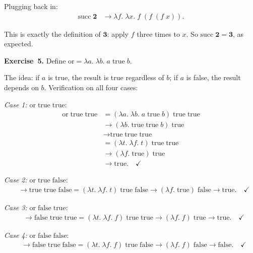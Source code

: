 \documentclass[11pt]{article}
\begin{document}
Plugging back in:
\begin{align*}
  \text{succ}\;\mathbf{2}
    &\longrightarrow \lambda f.\;\lambda x.\; f\;(f\;(f\; x)).
\end{align*}

This is exactly the definition of $\mathbf{3}$: apply $f$ three times
to $x$.  So $\text{succ}\;\mathbf{2} = \mathbf{3}$, as expected.

\medskip
\textbf{Exercise~5.}
Define $\text{or} = \lambda a.\;\lambda b.\; a\;\text{true}\; b$.

The idea: if $a$ is true, the result is true regardless of $b$; if
$a$ is false, the result depends on $b$.  Verification on all four
cases:

\medskip
\emph{Case 1:} $\text{or}\;\text{true}\;\text{true}$:
\begin{align*}
  \text{or}\;\text{true}\;\text{true}
    &= (\lambda a.\;\lambda b.\; a\;\text{true}\; b)\;\text{true}\;\text{true} \\
    &\longrightarrow (\lambda b.\; \text{true}\;\text{true}\; b)\;\text{true} \\
    &\longrightarrow \text{true}\;\text{true}\;\text{true} \\
    &= (\lambda t.\;\lambda f.\; t)\;\text{true}\;\text{true} \\
    &\longrightarrow (\lambda f.\;\text{true})\;\text{true} \\
    &\longrightarrow \text{true}. \quad\checkmark
\end{align*}

\emph{Case 2:} $\text{or}\;\text{true}\;\text{false}$:
\begin{align*}
  &\longrightarrow \text{true}\;\text{true}\;\text{false}
   = (\lambda t.\;\lambda f.\; t)\;\text{true}\;\text{false}
   \longrightarrow (\lambda f.\;\text{true})\;\text{false}
   \longrightarrow \text{true}. \quad\checkmark
\end{align*}

\emph{Case 3:} $\text{or}\;\text{false}\;\text{true}$:
\begin{align*}
  &\longrightarrow \text{false}\;\text{true}\;\text{true}
   = (\lambda t.\;\lambda f.\; f)\;\text{true}\;\text{true}
   \longrightarrow (\lambda f.\; f)\;\text{true}
   \longrightarrow \text{true}. \quad\checkmark
\end{align*}

\emph{Case 4:} $\text{or}\;\text{false}\;\text{false}$:
\begin{align*}
  &\longrightarrow \text{false}\;\text{true}\;\text{false}
   = (\lambda t.\;\lambda f.\; f)\;\text{true}\;\text{false}
   \longrightarrow (\lambda f.\; f)\;\text{false}
   \longrightarrow \text{false}. \quad\checkmark
\end{align*}
\end{document}
